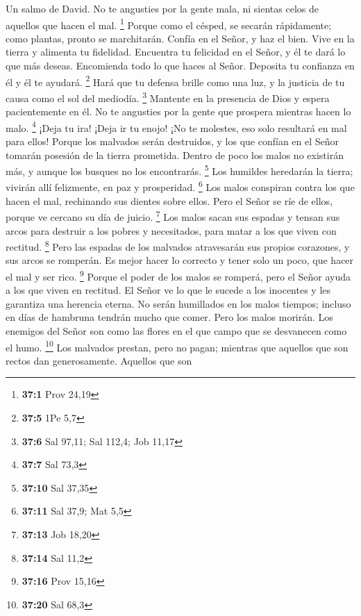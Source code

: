 Un salmo de David.  No te angusties por la gente mala, ni
sientas celos de aquellos que hacen el mal. \footnote{\textbf{37:1} Prov
  24,19}  Porque como el césped, se secarán rápidamente;
como plantas, pronto se marchitarán.  Confía en el Señor, y
haz el bien. Vive en la tierra y alimenta tu fidelidad. 
Encuentra tu felicidad en el Señor, y él te dará lo que más deseas.
 Encomienda todo lo que haces al Señor. Deposita tu
confianza en él y él te ayudará. \footnote{\textbf{37:5} 1Pe 5,7}
 Hará que tu defensa brille como una luz, y la justicia de
tu causa como el sol del mediodía. \footnote{\textbf{37:6} Sal 97,11;
  Sal 112,4; Job 11,17}  Mantente en la presencia de Dios y
espera pacientemente en él. No te angusties por la gente que prospera
mientras hacen lo malo. \footnote{\textbf{37:7} Sal 73,3} 
¡Deja tu ira! ¡Deja ir tu enojo! ¡No te molestes, eso solo resultará en
mal para ellos!  Porque los malvados serán destruidos, y los
que confían en el Señor tomarán posesión de la tierra prometida.
 Dentro de poco los malos no existirán más, y aunque los
busques no los encontrarás. \footnote{\textbf{37:10} Sal 37,35}
 Los humildes heredarán la tierra; vivirán allí felizmente,
en paz y prosperidad. \footnote{\textbf{37:11} Sal 37,9; Mat 5,5}
 Los malos conspiran contra los que hacen el mal,
rechinando sus dientes sobre ellos.  Pero el Señor se ríe
de ellos, porque ve cercano su día de juicio. \footnote{\textbf{37:13}
  Job 18,20}  Los malos sacan sus espadas y tensan sus
arcos para destruir a los pobres y necesitados, para matar a los que
viven con rectitud. \footnote{\textbf{37:14} Sal 11,2} 
Pero las espadas de los malvados atravesarán sus propios corazones, y
sus arcos se romperán.  Es mejor hacer lo correcto y tener
solo un poco, que hacer el mal y ser rico. \footnote{\textbf{37:16} Prov
  15,16}  Porque el poder de los malos se romperá, pero el
Señor ayuda a los que viven en rectitud.  El Señor ve lo
que le sucede a los inocentes y les garantiza una herencia eterna.
 No serán humillados en los malos tiempos; incluso en días
de hambruna tendrán mucho que comer.  Pero los malos
morirán. Los enemigos del Señor son como las flores en el que campo que
se desvanecen como el humo. \footnote{\textbf{37:20} Sal 68,3}
 Los malvados prestan, pero no pagan; mientras que aquellos
que son rectos dan generosamente.  Aquellos que son
